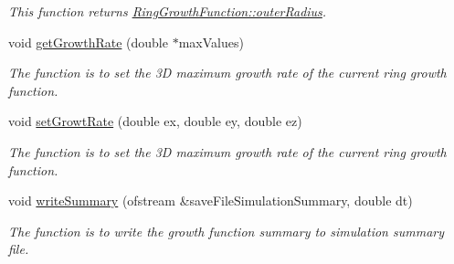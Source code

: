 \begin{DoxyCompactItemize}
\begin{DoxyCompactList}\small\item\em This function returns \hyperlink{classRingGrowthFunction_a8b7d5268d9d47f112b56feef58193649}{Ring\+Growth\+Function\+::outer\+Radius}. \end{DoxyCompactList}\item 
void \hyperlink{classRingGrowthFunction_ab3cc1858fb602ab40a74af7d0467c13b}{get\+Growth\+Rate} (double $\ast$max\+Values)
\begin{DoxyCompactList}\small\item\em The function is to set the 3\+D maximum growth rate of the current ring growth function. \end{DoxyCompactList}\item 
void \hyperlink{classRingGrowthFunction_a051da280e649c81afff38a1a45cb035a}{set\+Growt\+Rate} (double ex, double ey, double ez)
\begin{DoxyCompactList}\small\item\em The function is to set the 3\+D maximum growth rate of the current ring growth function. \end{DoxyCompactList}\item 
void \hyperlink{classRingGrowthFunction_a681175045cf09fadd92921e129737e65}{write\+Summary} (ofstream \&save\+File\+Simulation\+Summary, double dt)
\begin{DoxyCompactList}\small\item\em The function is to write the growth function summary to simulation summary file. \end{DoxyCompactList}\end{DoxyCompactItemize}
